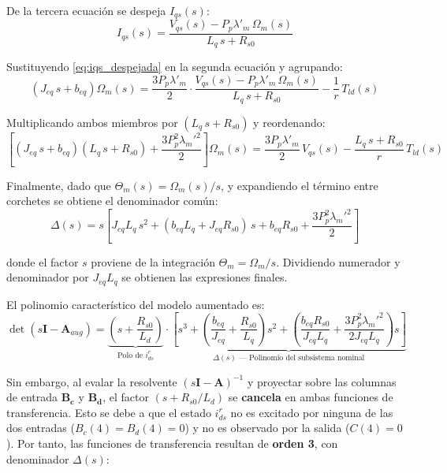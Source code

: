 \documentclass[12pt, a4paper,journal, onecolumn, compsoc]{IEEEtran}
\begin{document}
De la tercera ecuación se despeja $I_{qs}(s)$:
\begin{equation}\label{eq:iqs_despejada}
    I_{qs}(s) = \frac{V_{qs}(s) - P_p \lambda'_m\,\Omega_m(s)}{L_q\,s + R_{s0}}
\end{equation}

Sustituyendo \eqref{eq:iqs_despejada} en la segunda ecuación y agrupando:
\begin{equation}
    \left(J_{eq}\,s + b_{eq}\right)\Omega_m(s) = \frac{3 P_p \lambda'_m}{2} \cdot \frac{V_{qs}(s) - P_p \lambda'_m\,\Omega_m(s)}{L_q\,s + R_{s0}} - \frac{1}{r}\,T_{ld}(s)
\end{equation}

Multiplicando ambos miembros por $(L_q\,s + R_{s0})$ y reordenando:
\begin{equation}
    \left[(J_{eq}\,s + b_{eq})(L_q\,s + R_{s0}) + \frac{3 P_p^2 \lambda_m'^2}{2}\right]\Omega_m(s) = \frac{3 P_p \lambda'_m}{2}\,V_{qs}(s) - \frac{L_q\,s + R_{s0}}{r}\,T_{ld}(s)
\end{equation}

Finalmente, dado que $\Theta_m(s) = \Omega_m(s)/s$, y expandiendo el término entre corchetes se obtiene el denominador común:
\begin{equation}
    \Delta(s) = s\left[J_{eq} L_q\,s^2 + (b_{eq} L_q + J_{eq} R_{s0})\,s + b_{eq} R_{s0} + \frac{3 P_p^2 \lambda_m'^2}{2}\right]
\end{equation}

donde el factor $s$ proviene de la integración $\Theta_m = \Omega_m / s$. Dividiendo numerador y denominador por $J_{eq} L_q$ se obtienen las expresiones finales.

\vspace{0.3cm}

El polinomio característico del modelo aumentado es:
\begin{equation}
    \det(s\mathbf{I} - \mathbf{A}_{aug}) = \underbrace{\left(s + \frac{R_{s0}}{L_d}\right)}_{\text{Polo de } i_{ds}^r} \cdot \underbrace{\left[ s^3 + \left(\frac{b_{eq}}{J_{eq}} + \frac{R_{s0}}{L_q}\right)s^2 + \left(\frac{b_{eq} R_{s0}}{J_{eq} L_q} + \frac{3 P_p^2 \lambda_m'^2}{2 J_{eq} L_q}\right)s \right]}_{\Delta(s) \text{ --- Polinomio del subsistema nominal}}
\end{equation}

Sin embargo, al evalar la resolvente $(s\mathbf{I}-\mathbf{A})^{-1}$ y proyectar sobre las columnas de entrada $\mathbf{B_c}$ y $\mathbf{B_d}$, el factor $(s + R_{s0}/L_d)$ se \textbf{cancela} en ambas funciones de transferencia. Esto se debe a que el estado $i_{ds}^r$ no es excitado por ninguna de las dos entradas ($B_c(4) = B_d(4) = 0$) y no es observado por la salida ($C(4) = 0$). Por tanto, las funciones de transferencia resultan de \textbf{orden 3}, con denominador $\Delta(s)$:
\end{document}

